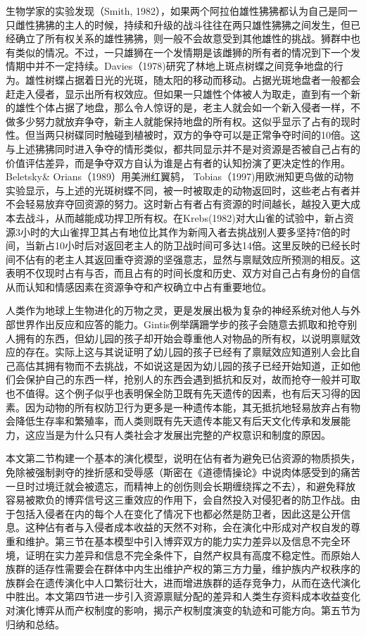 \documentclass[lang=cn,12pt,a4paper]{elegantpaper}
\begin{document}
生物学家的实验发现（Smith, 1982），如果两个阿拉伯雄性狒狒都认为自己是同一只雌性狒狒的主人的时候，持续和升级的战斗往往在两只雄性狒狒之间发生，但已经确立了所有权关系的雄性狒狒，则一般不会故意受到其他雄性的挑战。狮群中也有类似的情况。不过，一只雄狮在一个发情期是该雌狮的所有者的情况到下一个发情期中并不一定持续。Davies（1978)研究了林地上斑点树蝶之间竞争地盘的行为。雄性树蝶占据着日光的光斑，随太阳的移动而移动。占据光斑地盘者一般都会赶走入侵者，显示出所有权效应。但如果一只雄性个体被人为取走，直到有一个新的雄性个体占据了地盘，那么令人惊讶的是，老主人就会如一个新入侵者一样，不做多少努力就放弃争夺，新主人就能保持地盘的所有权。这似乎显示了占有的现时性。但当两只树碟同时触碰到植被时，双方的争夺可以是正常争夺时间的10倍。这与上述狒狒同时进入争夺的情形类似，都共同显示并不是对资源是否被自己占有的价值评估差异，而是争夺双方自认为谁是占有者的认知扮演了更决定性的作用。Beletsky\& Orians（1989）用美洲红翼鸫， Tobias（1997)用欧洲知更鸟做的动物实验显示，与上述的光斑树蝶不同，被一时被取走的动物返回时，这些老占有者并不会轻易放弃夺回资源的努力。这时新占有者占有资源的时间越长，越投入更大成本去战斗，从而越能成功捍卫所有权。在Krebs(1982)对大山雀的试验中，新占资源3小时的大山雀捍卫其占有地位比其作为新闯入者去挑战别人要多坚持7倍的时间，当新占10小时后对返回老主人的防卫战时间可多达14倍。这里反映的已经长时间不佔有的老主人其返回重夺资源的坚强意志，显然与禀赋效应所预测的相反。这表明不仅现时占有与否，而且占有的时间长度和历史、双方对自己占有身份的自信从而认知和情感因素在资源争夺和产权确立中占有重要地位。

人类作为地球上生物进化的万物之灵，更是发展出极为复杂的神经系统对他人与外部世界作出反应和应答的能力。Gintis例举蹒跚学步的孩子会随意去抓取和抢夺别人拥有的东西，但幼儿园的孩子却开始会尊重他人对物品的所有权，以说明禀赋效应的存在。实际上这与其说证明了幼儿园的孩子已经有了禀赋效应知道别人会比自己高估其拥有物而不去挑战，不如说这是因为幼儿园的孩子已经开始知道，正如他们会保护自己的东西一样，抢别人的东西会遇到抵抗和反对，故而抢夺一般并可取也不值得。这个例子似乎也表明保全防卫既有先天遗传的因素，也有后天习得的因素。因为动物的所有权防卫行为更多是一种遗传本能，其无抵抗地轻易放弃占有物会降低生存率和繁殖率，而人类则既有先天遗传本能又有后天文化传承和发展能力，这应当是为什么只有人类社会才发展出完整的产权意识和制度的原因。

本文第二节构建一个基本的演化模型，说明在佔有者为避免已佔资源的物质损失，免除被强制剥夺的挫折感和受辱感（斯密在《道德情操论》中说肉体感受到的痛苦一旦时过境迁就会被遗忘，而精神上的创伤则会长期缠绕挥之不去），和避免释放容易被欺负的博弈信号这三重效应的作用下，会自然投入对侵犯者的防卫作战。由于包括入侵者在内的每个人在变化了情况下也都必然是防卫者，因此这是公开信息。这种佔有者与入侵者成本收益的天然不对称，会在演化中形成对产权自发的尊重和维护。第三节在基本模型中引入博弈双方的能力实力差异以及信息不完全环境，证明在实力差异和信息不完全条件下，自然产权具有高度不稳定性。而原始人族群的适存性需要会在群体中内生出维护产权的第三方力量，维护族内产权秩序的族群会在遗传演化中人口繁衍壮大，进而增进族群的适存竞争力，从而在迭代演化中胜出。本文第四节进一步引入资源禀赋分配的差异和人类生存资料成本收益变化对演化博弈从而产权制度的影响，揭示产权制度演变的轨迹和可能方向。第五节为归纳和总结。
\end{document}

